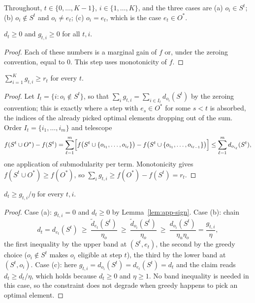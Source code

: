 Throughout, $t\in\{0,\dots,K-1\}$, $i\in\{1,\dots,K\}$, and the three cases are
(a) $o_i\in S^{t}$; (b) $o_i\notin S^{t}$ and $o_i\ne e_t$; (c) $o_i=e_t$,
which is the case $e_t\in O^{\ast}$.

\begin{lemma}[signs]\label{lem:app-sign}
$d_t\ge0$ and $g_{t,i}\ge0$ for all $t,i$.
\end{lemma}
\begin{proof}
Each of these numbers is a marginal gain of $f$ or, under the zeroing
convention, equal to $0$.  This step uses monotonicity of $f$.
\end{proof}

\begin{lemma}\label{lem:app-sum}
$\sum_{i=1}^{K}g_{t,i}\ge r_t$ for every $t$.
\end{lemma}
\begin{proof}
Let $I_t=\{i:o_i\notin S^{t}\}$, so that
$\sum_ig_{t,i}=\sum_{i\in I_t}d_{o_i}(S^{t})$ by the zeroing convention; this
is exactly where a step with $e_s\in O^{\ast}$ for some $s<t$ is absorbed, the
indices of the already picked optimal elements dropping out of the sum.  Order
$I_t=\{i_1,\dots,i_m\}$ and telescope
\[
  f(S^{t}\cup O^{\ast})-f(S^{t})
  =\sum_{\ell=1}^{m}\Bigl[f\bigl(S^{t}\cup\{o_{i_1},\dots,o_{i_\ell}\}\bigr)
   -f\bigl(S^{t}\cup\{o_{i_1},\dots,o_{i_{\ell-1}}\}\bigr)\Bigr]
  \le\sum_{\ell=1}^{m}d_{o_{i_\ell}}(S^{t}),
\]
one application of submodularity per term.  Monotonicity gives
$f(S^{t}\cup O^{\ast})\ge f(O^{\ast})$, so
$\sum_ig_{t,i}\ge f(O^{\ast})-f(S^{t})=r_t$.
\end{proof}

\begin{lemma}
\label{lem:app-pred}
$d_t\ge g_{t,i}/\eta$ for every $t,i$.
\end{lemma}
\begin{proof}
Case (a): $g_{t,i}=0$ and $d_t\ge0$ by Lemma~\ref{lem:app-sign}.
Case (b): chain
\[
  d_t=d_{e_t}(S^{t})\ \ge\ \frac{\tilde d_{e_t}(S^{t})}{\eta_o}
  \ \ge\ \frac{\tilde d_{o_i}(S^{t})}{\eta_o}
  \ \ge\ \frac{d_{o_i}(S^{t})}{\eta_u\eta_o}=\frac{g_{t,i}}{\eta},
\]
the first inequality by the upper band at $(S^{t},e_t)$, the second by the
greedy choice ($o_i\notin S^{t}$ makes $o_i$ eligible at step $t$), the third
by the lower band at $(S^{t},o_i)$.
Case (c): here $g_{t,i}=d_{o_i}(S^{t})=d_{e_t}(S^{t})=d_t$ and the claim reads
$d_t\ge d_t/\eta$, which holds because $d_t\ge0$ and $\eta\ge1$.  No band
inequality is needed in this case, so the constraint does not degrade when
greedy happens to pick an optimal element.
\end{proof}


